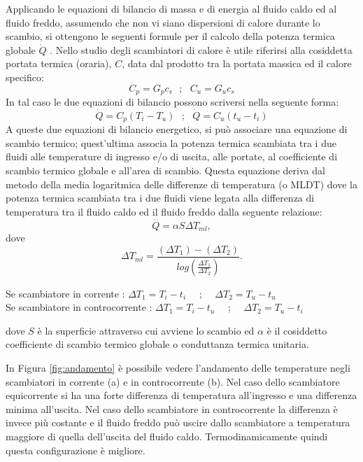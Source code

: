 \documentclass[laurea,oneside,11pt]{USiena_tesiLM3}
\begin{document}
Applicando le equazioni di bilancio di massa e di energia al fluido caldo ed al fluido freddo, assumendo che non vi siano dispersioni di calore durante lo scambio, si ottengono le seguenti formule per il calcolo della potenza termica globale $\dot{Q}$ \cite{pistocchini2010ottimizzazione}. Nello studio degli scambiatori di calore è  utile riferirsi alla cosiddetta portata termica (oraria), $C$, data dal prodotto tra la portata massica ed il calore specifico:
\begin{equation}
C_p=G_p c_s  \ \ \ ; \ \ \ C_u=G_u c_s
\end{equation}
In tal caso le due equazioni di bilancio  possono scriversi nella seguente forma:
\begin{equation}
\dot{Q}=C_p(T_i - T_u) \ \ \ ; \ \ \ \dot{Q}=C_u(t_u - t_i)
\label{eq:scambiatore1}
\end{equation}
A queste due equazioni di bilancio energetico, si può associare una equazione di scambio termico; quest'ultima associa la potenza termica scambiata tra i due fluidi alle temperature di ingresso e/o di uscita, alle portate, al coefficiente di scambio termico globale e all'area di scambio. Questa equazione deriva dal metodo della media logaritmica delle differenze di temperatura (o MLDT) dove  la potenza termica scambiata tra i due fluidi viene legata alla differenza di temperatura tra il fluido caldo ed il fluido freddo dalla seguente relazione:
\begin{equation}
\dot{Q}=\alpha S \Delta T_{ml} ,
\end{equation}
dove
\begin{equation}
 \Delta T_{ml} = \frac{(\Delta T_1)-(\Delta T_2)}{log\left( \frac{\Delta T_1}{\Delta T_2} \right)}.
 \label{eq:scambiatore2}
 \end{equation}
 \begin{center}
 Se scambiatore in corrente : $ \Delta T_1 = T_i - t_i $  \ \ ; \ \ $ \Delta T_2 = T_u - t_u $  \\
 
 Se scambiatore in controcorrente : $ \Delta T_1 = T_i - t_u $  \ \ ; \ \ $ \Delta T_2 = T_u - t_i $ 
\end{center}
dove $S$ \`e  la superficie attraverso cui avviene lo scambio ed $\alpha$ \`e  il cosiddetto coefficiente di scambio termico globale o conduttanza termica unitaria. 

In Figura \ref{fig:andamento} è  possibile vedere l'andamento delle temperature negli scambiatori in corrente (a) e in controcorrente (b).
Nel caso dello scambiatore equicorrente si ha una forte differenza di temperatura all'ingresso e una differenza  minima  all'uscita.  Nel  caso  dello  scambiatore in controcorrente  la  differenza  è invece più costante e il fluido freddo può uscire dallo scambiatore a temperatura maggiore di  quella  dell'uscita del fluido  caldo. 
Termodinamicamente quindi  questa  configurazione  è migliore. 
\end{document}
